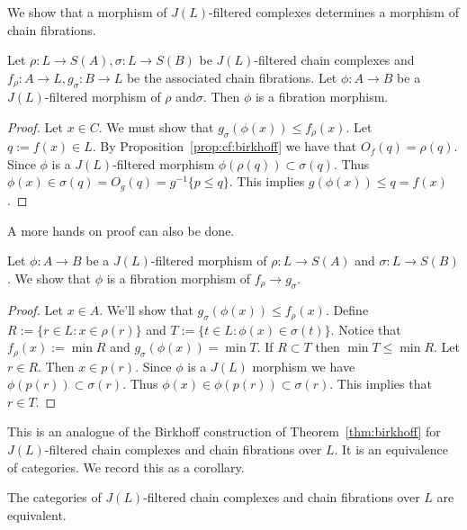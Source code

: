 We show that a morphism of $J(L)$-filtered complexes determines a morphism of chain fibrations.  

\begin{prop}
Let $\rho:L\to S(A),\sigma:L\to S(B)$ be $J(L)$-filtered chain complexes and $f_\rho:A\to L, g_\sigma:B\to L$ be the associated chain fibrations.  Let $\phi:A\to B$ be a $J(L)$-filtered morphism of $\rho$ and$ \sigma$.  Then $\phi$ is a fibration morphism.
\end{prop}
\begin{proof}
Let $x\in C$.  We must show that $g_\sigma(\phi(x))\leq f_\rho(x)$.  Let $q:= f(x)\in L$.  By Proposition~\ref{prop:cf:birkhoff} we have that $O_f(q) = \rho(q)$.  Since $\phi$ is a $J(L)$-filtered morphism $\phi(\rho(q))\subset \sigma(q)$.  Thus $\phi(x)\in \sigma(q)= O_g(q)=g^{-1}\{p\leq q\}$.  This implies $g(\phi(x))\leq q = f(x)$.
\end{proof}

A more hands on proof can also be done.
\begin{prop}
Let $\phi:A\to B$ be a $J(L)$-filtered morphism of $\rho:L\to S(A)$ and $\sigma:L\to S(B)$.  We show that $\phi$ is a fibration morphism of $f_\rho\to g_\sigma$.
\end{prop}
\begin{proof}
Let $x\in A$.  We'll show that $g_\sigma(\phi(x))\leq f_\rho(x)$.   Define $R:= \{r\in L:x\in \rho(r)\}$ and $T:=\{t\in L:\phi(x)\in \sigma(t)\}$.  Notice that $f_\rho(x):= \min R$ and $g_\sigma(\phi(x)) = \min T$.  If $R\subset T$ then $\min T\leq \min R$.  Let $r\in R$.  Then $x\in p(r)$.  Since $\phi$ is a $J(L)$ morphism we have $\phi(p(r))\subset \sigma(r)$.  Thus $\phi(x)\in \phi(p(r))\subset \sigma(r)$.  This implies that $r\in T$. 
\end{proof}




 
This is an analogue of the Birkhoff construction of Theorem~\ref{thm:birkhoff} for $J(L)$-filtered chain complexes and chain fibrations over $L$.  It is an equivalence of categories.  We record this as a corollary.

\begin{cor}
The categories of $J(L)$-filtered chain complexes and chain fibrations over $L$ are equivalent.
\end{cor}

















 
